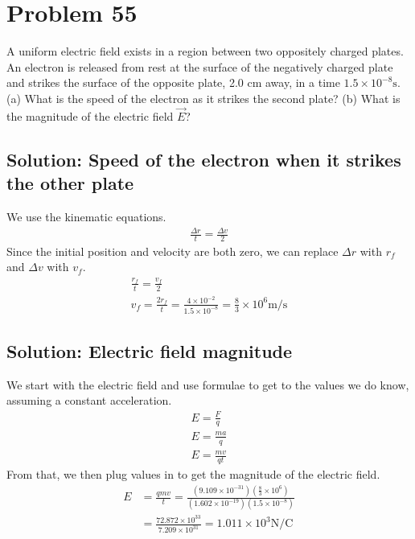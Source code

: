 \documentclass[12pt]{article}
\begin{document}
\pagebreak
\section{Problem 55}
A uniform electric field exists in a region between two oppositely charged plates. An electron is released from rest at the surface of the negatively charged plate and strikes the surface of the opposite plate, 2.0 cm away, in a time $1.5 \times 10^{-8} \unit{\second}$. (a) What is the speed of the electron as it strikes the second plate? (b) What is the magnitude of the electric field $\vec{E}$?

\subsection{Solution: Speed of the electron when it strikes the other plate}
We use the kinematic equations.
\begin{gather*}
    \frac{\Delta r}{t} = \frac{\Delta v}{2}
\end{gather*}
Since the initial position and velocity are both zero, we can replace $\Delta r$ with $r_f$ and $\Delta v$ with $v_f$.
\begin{gather*}
    \frac{r_f}{t}   =   \frac{v_f}{2}\\
    v_f =   \frac{2r_f}{t}
        =   \frac{4 \times 10^{-2}}{1.5 \times 10^{-8}}
        =   \boxed{\frac{8}{3} \times 10^6 \unit{\meter/\second}}
\end{gather*}

\subsection{Solution: Electric field magnitude}
We start with the electric field and use formulae to get to the values we do know, assuming a constant acceleration.
\begin{gather*}
    E = \frac{F}{q}\\
    E = \frac{ma}{q}\\
    E = \frac{mv}{qt}
\end{gather*}
From that, we then plug values in to get the magnitude of the electric field.
\begin{align*}
    E   &=  \frac{qmv}{t}
        =   \frac{(9.109 \times 10^{-31})(\frac{8}{3} \times 10^6)}{(1.602 \times 10^{-19})(1.5 \times 10^{-8})}\\
        &=  \frac{72.872 \times 10^{33}}{7.209 \times 10^{31}}
        =   \boxed{1.011 \times 10^3 \unit{\newton/\coulomb}}
\end{align*}
\end{document}
